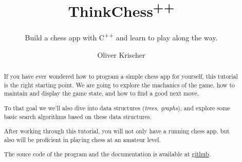 \documentclass{scrreprt}
\numberwithin{equation}{chapter}
\begin{document}
\title{ThinkChess\textsuperscript{++}}
\author{Oliver Krischer}
\subtitle{Build a chess app with C\textsuperscript{++} and learn to play along the way.}
\maketitle
\begin{abstract}
  If you have ever wondered how to program a simple chess app for yourself,
  this tutorial is the right starting point.
  We are going to explore the machanics of the game, how to maintain and display the game
  state, and how to find a good next move.

  To that goal we we'll also dive into data structures (\emph{trees, graphs}),
  and explore some basic search algorithms based on these data structures.

  After working through this tutorial, you will not only have a running chess app,
  but also will be proficient in playing chess at an amateur level. 

  The souce code of the program and the documentation is available at
  \href{https://github.com/okrischer/ThinkChess}{github}.
\end{abstract}
\tableofcontents




\end{document}
